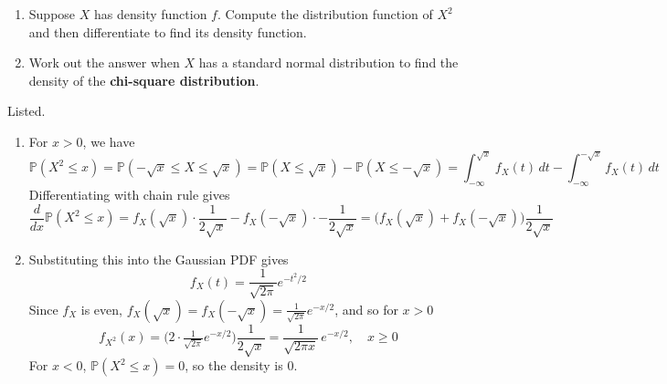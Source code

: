   \begin{exercise}[Durrett 1.2.7]
    \begin{enumerate}
      \item Suppose $X$ has density function $f$. Compute the distribution function of $X^2$ and then differentiate to find its density function.
      \item Work out the answer when $X$ has a standard normal distribution to find the density of the \textbf{chi-square distribution}.
    \end{enumerate}
  \end{exercise}
  \begin{solution}
    Listed. 
		\begin{enumerate}
		  \item For $x > 0$, we have 
				\begin{equation}
					\mathbb{P}(X^2 \leq x) = \mathbb{P}(-\sqrt{x} \leq X \leq \sqrt{x}) = \mathbb{P}(X \leq \sqrt{x}) - \mathbb{P}(X \leq -\sqrt{x}) = \int_{-\infty}^{\sqrt{x}} f_X (t)\,dt - \int_{-\infty}^{-\sqrt{x}} f_X (t) \,dt 
				\end{equation}
				Differentiating with chain rule gives 
				\begin{equation}
					\frac{d}{dx} \mathbb{P}(X^2 \leq x) = f_X (\sqrt{x}) \cdot \frac{1}{2\sqrt{x}} - f_X (-\sqrt{x}) \cdot -\frac{1}{2\sqrt{x}} = \big( f_X (\sqrt{x}) + f_X (-\sqrt{x}) \big) \frac{1}{2 \sqrt{x}}
				\end{equation}

			\item Substituting this into the Gaussian PDF gives 
				\begin{equation}
					f_X (t) = \frac{1}{\sqrt{2\pi}} e^{-t^2/2}
				\end{equation}
				Since $f_X$ is even, $f_X (\sqrt{x}) = f_X (-\sqrt{x}) = \frac{1}{\sqrt{2\pi}} e^{-x/2}$, and so for $x > 0$ 
				\begin{equation}
					f_{X^2} (x) = \big( 2 \cdot \tfrac{1}{\sqrt{2\pi}} e^{-x/2} \big) \frac{1}{2\sqrt{x}} = \frac{1}{\sqrt{2\pi x}} \, e^{-x/2}, \quad x \geq 0
				\end{equation}
				For $x < 0$, $\mathbb{P}(X^2 \leq x) = 0$, so the density is $0$. 
		\end{enumerate}
  \end{solution}

